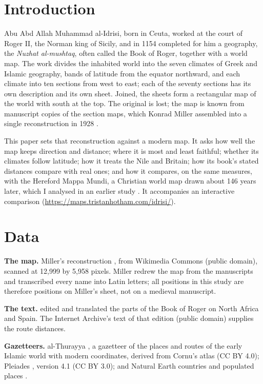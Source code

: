 \documentclass[11pt,a4paper]{article}
\begin{document}
\section{Introduction}
Abu Abd Allah Muhammad al-Idrisi, born in Ceuta, worked at the court of Roger II, the Norman king of Sicily, and in 1154 completed for him a geography, the \textit{Nuzhat al-mushtaq}, often called the Book of Roger, together with a world map. The work divides the inhabited world into the seven climates of Greek and Islamic geography, bands of latitude from the equator northward, and each climate into ten sections from west to east; each of the seventy sections has its own description and its own sheet. Joined, the sheets form a rectangular map of the world with south at the top. The original is lost; the map is known from manuscript copies of the section maps, which Konrad Miller assembled into a single reconstruction in 1928 \citep{miller1928}.

This paper sets that reconstruction against a modern map. It asks how well the map keeps direction and distance; where it is most and least faithful; whether its climates follow latitude; how it treats the Nile and Britain; how its book's stated distances compare with real ones; and how it compares, on the same measures, with the Hereford Mappa Mundi, a Christian world map drawn about 146 years later, which I analysed in an earlier study \citep{hereford}. It accompanies an interactive comparison (\url{https://maps.tristanhotham.com/idrisi/}).

\section{Data}
\textbf{The map.} Miller's reconstruction \citep{miller1928}, from Wikimedia Commons (public domain), scanned at 12,999 by 5,958 pixels. Miller redrew the map from the manuscripts and transcribed every name into Latin letters; all positions in this study are therefore positions on Miller's sheet, not on a medieval manuscript.

\textbf{The text.} \citet{dozy} edited and translated the parts of the Book of Roger on North Africa and Spain. The Internet Archive's text of that edition (public domain) supplies the route distances.

\textbf{Gazetteers.} al-Thurayya \citep{thurayya}, a gazetteer of the places and routes of the early Islamic world with modern coordinates, derived from Cornu's atlas (CC BY 4.0); Pleiades \citep{pleiades}, version 4.1 (CC BY 3.0); and Natural Earth countries and populated places \citep{naturalearth}.
\end{document}
